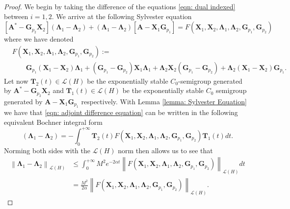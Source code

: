 \documentclass[10pt,a4paper]{amsart}
\newcommand{\bA}{\mathbf A}
\newcommand{\bG}{\mathbf G}
\newcommand{\bLambda}{\boldsymbol{\Lambda}}
\newcommand{\bT}{\mathbf T}
\newcommand{\bX}{\mathbf X}
\newcommand{\br}[1]{\left[ #1 \right]}
\newcommand{\norm}[1]{\left\| #1 \right\|}
\newcommand{\p}[1]{\left( {#1} \right)}
\newcommand{\sL}{\mathscr L}
\begin{document}
\begin{proof}
    We begin by taking the difference of the equations \eqref{eqn: dual indexed} between $i=1,2$. We arrive at the following Sylvester equation
    \begin{equation} \label{eqn: adjoint difference equation}
        \br{\bA^* - \bG_{p_2}\bX_2}\p{\bLambda_1 - \bLambda_2} + \p{\bLambda_1 - \bLambda_2}\br{\bA - \bX_1\bG_{p_1}} 
        = F(\bX_1, \bX_2, \bLambda_1, \bLambda_2, \bG_{p_1}, \bG_{p_2})
    \end{equation}
    where we have denoted
    $$
    \begin{aligned}
        &F(\bX_1, \bX_2, \bLambda_1, \bLambda_2, \bG_{p_1}, \bG_{p_2}) := \\
        & \qquad 
        \bG_{p_1}(\bX_1-\bX_2)\bLambda_1 
        + (\bG_{p_1} - \bG_{p_2})\bX_1\bLambda_1 
        + \bLambda_2 \bX_2(\bG_{p_1}-\bG_{p_2}) 
        + \bLambda_2(\bX_1 - \bX_2)\bG_{p_1}. 
    \end{aligned}
    $$
    Let now $\bT_2(t) \in \sL\p{H}$ be the exponentially stable $C_0$-semigroup generated by $\bA^* - \bG_{p_2}\bX_2$ and $\bT_1(t) \in \sL\p{H}$ be the exponentially stable $C_0$ semigroup generated by $\bA - \bX_1\bG_{p_1}$ respectively. With Lemma \ref{lemma: Sylvester Equation} we have that \eqref{eqn: adjoint difference equation} can be written in the following equivalent Bochner integral form
    $$
        (\bLambda_1 - \bLambda_2) = -\int_0^{+\infty} \bT_2(t) F\p{\bX_1, \bX_2, \bLambda_1, \bLambda_2, \bG_{p_1}, \bG_{p_2}} \bT_1(t) dt.
    $$
    Norming both sides with the $\sL\p{H}$ norm then allows us to see that 
    \begin{equation} \label{eqn: AAA}
    \begin{aligned}
        \norm{\bLambda_1 - \bLambda_2}_{\sL\p{H}} &\leq \int_0^{+\infty} M^2 e^{-2\alpha t } \norm{F(\bX_1, \bX_2, \bLambda_1, \bLambda_2, \bG_{p_1}, \bG_{p_2})}_{\sL\p{H}} dt \\
        &= \frac{M^2}{2\alpha} \norm{F(\bX_1, \bX_2, \bLambda_1, \bLambda_2, \bG_{p_1}, \bG_{p_2})}_{\sL\p{H}}.
    \end{aligned}
    \end{equation}
    

\end{proof}
\end{document}
